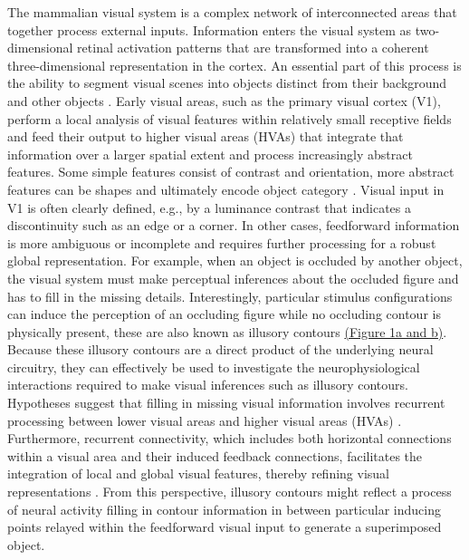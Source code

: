 \documentclass[12pt]{article}
\begin{document}
\setlength{\parindent}{24pt}
The mammalian visual system is a complex network of interconnected areas that together process external inputs. Information enters the visual system as two-dimensional retinal activation patterns that are transformed into a coherent three-dimensional representation in the cortex. An essential part of this process is the ability to segment visual scenes into objects distinct from their background and other objects \autocite{kirchbergerEssentialRoleFeedback2020}. Early visual areas, such as the primary visual cortex (V1), perform a local analysis of visual features within relatively small receptive fields and feed their output to higher visual areas (HVAs) that integrate that information over a larger spatial extent and process increasingly abstract features. Some simple features consist of contrast and orientation, more abstract features can be shapes and ultimately encode object category \autocite{ashbridgeEffectImageOrientation2000}. Visual input in V1 is often clearly defined, e.g., by a luminance contrast that indicates a discontinuity such as an edge or a corner. In other cases, feedforward information is more ambiguous or incomplete and requires further processing for a robust global representation. For example, when an object is occluded by another object, the visual system must make perceptual inferences about the occluded figure and has to fill in the missing details. Interestingly, particular stimulus configurations can induce the perception of an occluding figure while no occluding contour is physically present, these are also known as illusory contours \hyperref[fig:figure_1]{(Figure 1a and b)}. Because these illusory contours are a direct product of the underlying neural circuitry, they can effectively be used to investigate the neurophysiological interactions required to make visual inferences such as illusory contours. Hypotheses suggest that filling in missing visual information involves recurrent processing between lower visual areas and higher visual areas (HVAs) \autocite{wyatteEarlyRecurrentFeedback2014}. Furthermore, recurrent connectivity, which includes both horizontal connections within a visual area and their induced feedback connections, facilitates the integration of local and global visual features, thereby refining visual representations \autocite{roelfsemaCORTICALALGORITHMSPERCEPTUAL2006,shushruthStrongRecurrentNetworks2012}. From this perspective, illusory contours might reflect a process of neural activity filling in contour information in between particular inducing points relayed within the feedforward visual input to generate a superimposed object.
\setlength{\parindent}{0pt}
\end{document}
